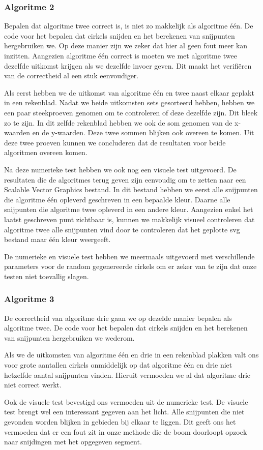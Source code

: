 \documentclass[11pt,a4paper]{article}
\begin{document}
\subsubsection*{Algoritme 2}

Bepalen dat algoritme twee correct is, is niet zo makkelijk als algoritme \'e\'en. De code voor het bepalen dat cirkels snijden en het berekenen van snijpunten hergebruiken we. Op deze manier zijn we zeker dat hier al geen fout meer kan inzitten.
Aangezien algoritme \'e\'en correct is moeten we met algoritme twee dezelfde uitkomst krijgen als we dezelfde invoer geven. Dit maakt het verifi\"eren van de correctheid al een stuk eenvoudiger.

Als eerst hebben we de uitkomst van algoritme \'e\'en en twee naast elkaar geplakt in een rekenblad. Nadat we beide uitkomsten sets gesorteerd hebben, hebben we een paar steekproeven genomen om te controleren of deze dezelfde zijn. Dit bleek zo te zijn. In dit zelfde rekenblad hebben we ook de som genomen van de x-waarden en de y-waarden. Deze twee sommen blijken ook overeen te komen. Uit deze twee proeven kunnen we concluderen dat de resultaten voor beide algoritmen overeen komen.

Na deze numerieke test hebben we ook nog een visuele test uitgevoerd. De resultaten die de algoritmes terug geven zijn eenvoudig om te zetten naar een Scalable Vector Graphics bestand. In dit bestand hebben we eerst alle snijpunten die algoritme \'e\'en opleverd geschreven in een bepaalde kleur. Daarne alle snijpunten die algoritme twee opleverd in een andere kleur. Aangezien enkel het laatst geschreven punt zichtbaar is, kunnen we makkelijk visueel controleren dat algoritme twee alle snijpunten vind door te controleren dat het geplotte svg bestand maar \'e\'en kleur weergeeft.

De numerieke en visuele test hebben we meermaals uitgevoerd met verschillende parameters voor de random gegenereerde cirkels om er zeker van te zijn dat onze testen niet toevallig slagen.

\subsubsection*{Algoritme 3}

De correctheid van algoritme drie gaan we op dezelde manier bepalen als algoritme twee. De code voor het bepalen dat cirkels snijden en het berekenen van snijpunten hergebruiken we wederom.

Als we de uitkomsten van algoritme \'e\'en en drie in een rekenblad plakken valt ons voor grote aantallen cirkels onmiddelijk op dat algoritme \'e\'en en drie niet hetzelfde aantal snijpunten vinden. Hieruit vermoeden we al dat algoritme drie niet correct werkt.

Ook de visuele test bevestigd ons vermoeden uit de numerieke test. De visuele test brengt wel een interessant gegeven aan het licht. Alle snijpunten die niet gevonden worden blijken in gebieden bij elkaar te liggen. Dit geeft ons het vermoeden dat er een fout zit in onze methode die de boom doorloopt opzoek naar snijdingen met het opgegeven segment.
\end{document}
